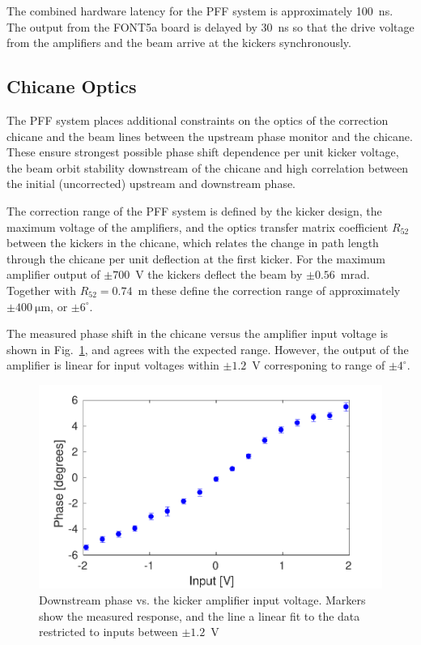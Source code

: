 \documentclass[%
 reprint,
superscriptaddress,
 amsmath,amssymb,
 prl,
]{revtex4-1}
\begin{document}
The combined hardware latency for the PFF system is approximately 100~ns. The 
output from the FONT5a board is delayed by 30~ns so that the drive voltage from 
the amplifiers and the beam arrive at the kickers synchronously.

\subsection{\label{ss:optics}Chicane Optics}

The PFF system places additional constraints on the optics of the correction 
chicane and the beam lines between the upstream phase monitor and the 
chicane. These ensure strongest possible phase shift dependence  
per unit kicker voltage, the beam 
orbit stability downstream of the chicane and high 
correlation between the initial (uncorrected) upstream and downstream phase.

The correction range of the PFF system is defined by the kicker design, the 
maximum  voltage of the  amplifiers, and the optics transfer matrix 
coefficient \(R_{52}\) between the kickers in the chicane, which relates 
the change in path length through the chicane per unit 
deflection at the first kicker.  
For the maximum amplifier output of \(\pm700\)~V the kickers deflect the beam by \(\pm0.56\)~mrad. 
Together with \(R_{52} = 0.74\)~m  these define the correction range of 
approximately \(\pm400~\mathrm{\mu m}\), or \(\pm6^\circ\).

The measured phase shift in the chicane versus the amplifier input voltage is 
shown in Fig.~\ref{fig:corrRange}, and agrees with the expected range. 
However, the output of the amplifier is 
linear for input voltages within \(\pm1.2\)~V corresponing to range of \(\pm4^\circ\).


\begin{figure}
	\includegraphics[width=\columnwidth]{figs/corrRange}
	\caption{\label{fig:corrRange}Downstream phase vs. the kicker amplifier 
	input voltage. Markers show the measured response, and the line a linear 
	fit to the data restricted to inputs between \(\pm1.2\)~V}
\end{figure}
\end{document}
